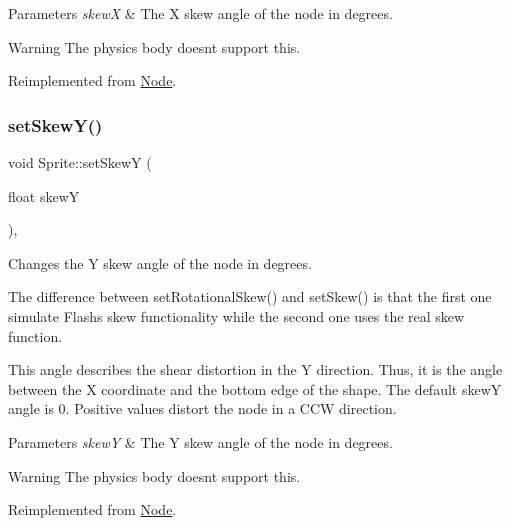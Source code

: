 \begin{DoxyParams}{Parameters}
{\em skewX} & The X skew angle of the node in degrees.\\
\hline
\end{DoxyParams}
\begin{DoxyWarning}{Warning}
The physics body doesn\textquotesingle{}t support this. 
\end{DoxyWarning}


Reimplemented from \hyperlink{classNode_a48cf4d7b304b57a3f593d9eecde3ac7f}{Node}.

\mbox{\label{classSprite_ab1d4bdeffe2b1fa8720481316123316a}} 
\subsubsection{\texorpdfstring{set\+Skew\+Y()}{setSkewY()}\hspace{0.1cm}{\footnotesize\ttfamily [1/2]}}
{\footnotesize\ttfamily void Sprite\+::set\+SkewY (\begin{DoxyParamCaption}\item[{float}]{skewY }\end{DoxyParamCaption})\hspace{0.3cm}{\ttfamily [override]}, {\ttfamily [virtual]}}

Changes the Y skew angle of the node in degrees.

The difference between {\ttfamily set\+Rotational\+Skew()} and {\ttfamily set\+Skew()} is that the first one simulate Flash\textquotesingle{}s skew functionality while the second one uses the real skew function.

This angle describes the shear distortion in the Y direction. Thus, it is the angle between the X coordinate and the bottom edge of the shape. The default skewY angle is 0. Positive values distort the node in a C\+CW direction.


\begin{DoxyParams}{Parameters}
{\em skewY} & The Y skew angle of the node in degrees.\\
\hline
\end{DoxyParams}
\begin{DoxyWarning}{Warning}
The physics body doesn\textquotesingle{}t support this. 
\end{DoxyWarning}


Reimplemented from \hyperlink{classNode_ac1f4c4be8099a0d4bca1464c51f81f94}{Node}.


